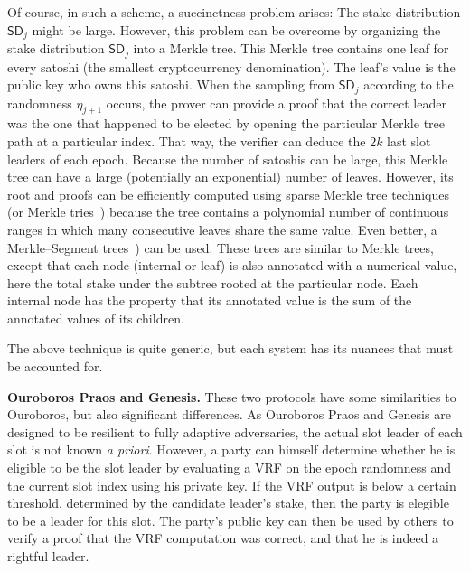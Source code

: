 Of course, in
such a scheme, a succinctness problem arises: The stake distribution $\textsf{SD}_j$ might be large.
However, this problem can be overcome by organizing the stake distribution $\textsf{SD}_j$ into a
Merkle tree. This Merkle tree contains one leaf for every satoshi (the smallest cryptocurrency
denomination). The leaf's value is the public key who owns this satoshi. When the sampling from
$\textsf{SD}_j$ according to the randomness $\eta_{j+1}$ occurs, the prover can provide a proof
that the correct leader was the one that happened to be elected by opening the particular Merkle
tree path at a particular index. That way, the verifier can deduce the $2k$ last slot leaders of each epoch. Because
the number of satoshis can be large, this Merkle tree can have a large (potentially an exponential)
number of leaves.
However, its root and proofs can be efficiently computed using sparse Merkle tree techniques~\cite{sparse-mt}
(or Merkle tries~\cite{wood})
because the tree contains a polynomial number of continuous ranges in which many consecutive
leaves share the same value.
Even better, a Merkle--Segment trees~\cite{flyclient}) can be used. These trees are similar to
Merkle trees, except that each node (internal or leaf) is also annotated with a numerical value,
here the total stake under the subtree rooted at the particular node. Each internal node has
the property that its annotated value is the sum of the annotated values of its children.

The above technique is quite generic, but each system has its nuances that must be accounted for.

\noindent
\textbf{Ouroboros Praos and Genesis.}
These two protocols have some similarities to Ouroboros, but also significant differences.
As Ouroboros Praos and Genesis are designed to be resilient to fully
adaptive adversaries, the actual slot leader of each slot is not known \emph{a priori}.
However, a party can himself determine whether he is eligible to be the
slot leader by evaluating a VRF on the epoch randomness and the current slot index
using his private key.
If the VRF output is below a certain threshold, determined by the candidate leader's
stake, then the party is elegible to be a leader for this slot.
The party's public key can then be used by others to verify a proof that the VRF computation
was correct, and that he is indeed a rightful leader.

